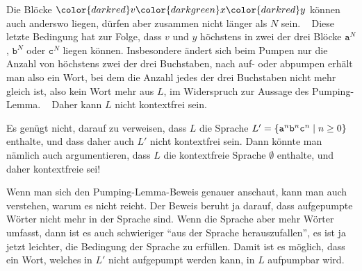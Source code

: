 \begin{loesung}
\begin{center}
\end{center}
Die Blöcke ${\color{darkred}v}{\color{darkgreen}x}{\color{darkred}y}$
können auch anderswo liegen, dürfen aber zusammen nicht länger als $N$ sein.
~%
Diese letzte Bedingung hat zur Folge, dass $v$ und $y$ höchstens in
zwei der drei Blöcke $\texttt{a}^N$, $\texttt{b}^N$ oder $\texttt{c}^N$
liegen können.
Insbesondere ändert sich beim Pumpen nur die Anzahl von höchstens zwei der drei
Buchstaben, nach auf- oder abpumpen erhält man also ein Wort, bei dem 
die Anzahl jedes der drei Buchstaben nicht mehr gleich ist, also kein
Wort mehr aus $L$, im Widerspruch zur Aussage des Pumping-Lemma.
~%
Daher kann $L$ nicht kontextfrei sein.
\end{loesung}

\begin{diskussion}
Es genügt nicht, darauf zu verweisen, dass $L$ die Sprache
$L'
=
\{
\texttt{a}\mathstrut^n \texttt{b}\mathstrut^n \texttt{c}\mathstrut^n
\mid n\ge 0
\}$
enthalte, und dass daher auch $L'$ nicht kontextfrei sein.
Dann könnte man nämlich auch argumentieren, dass $L$ die kontextfreie Sprache
$\emptyset$ enthalte, und daher kontextfreie sei!

Wenn man sich den Pumping-Lemma-Beweis genauer anschaut, kann man auch verstehen,
warum es nicht reicht. Der Beweis beruht ja darauf, dass aufgepumpte Wörter nicht
mehr in der Sprache sind. Wenn die Sprache aber mehr Wörter umfasst, dann ist
es auch schwieriger ``aus der Sprache herauszufallen'', es ist ja jetzt leichter,
die Bedingung der Sprache zu erfüllen. Damit ist es möglich, dass ein Wort, welches
in $L'$ nicht aufgepumpt werden kann, in $L$ aufpumpbar wird.
\end{diskussion}

